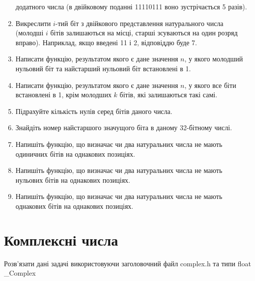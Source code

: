 \documentclass[]{article}
\begin{document}
\begin{enumerate}
  додатного числа (в двійковому поданні 11110111 воно зустрічається 5
  разів).
\item
  Викреслити $i$-тий біт з двійкового представлення натурального числа
  (молодші $i$ бітів залишаються на місці, старші зсуваються на один
  розряд вправо). Наприклад, якщо введені 11 і 2, відповіддю буде 7.
\item
  Написати функцію, результатом якого є дане значення $n$, у якого 
молодший нульовий біт та найстарший нульовий біт встановлені в 1.
\item
  Написати функцію, результатом якого є дане значення $n$, у якого все
  біти встановлені в 1, крім молодших $k$ бітів, які залишаються такі самі.
\item
  Підрахуйте кількість нулів серед бітів даного числа.
\item
  Знайдіть номер найстаршого значущого біта в даному 32-бітному числі.
\item
  Напишіть функцію, що визначає чи два натуральних числа не мають
  одиничних бітів на однакових позиціях.
\item
  Напишіть функцію, що визначає чи два натуральних числа не мають
  нульових бітів на однакових позиціях.
\item
  Напишіть функцію, що визначає чи два натуральних числа не мають
  однакових бітів на однакових позиціях.
\end{enumerate}

\section{Комплексні числа}

Розв'язати дані задачі
використовуючи заголовочний файл complex.h та типи float \_Complex
\end{document}
